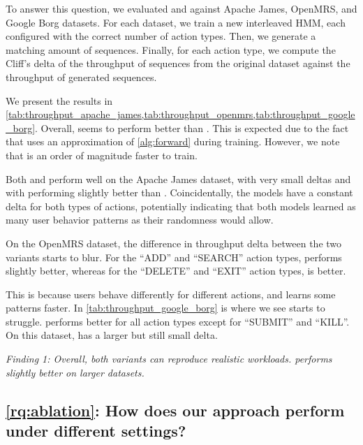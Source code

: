 To answer this question, we evaluated \worklogalpha{} and \worklogbeta{} against Apache James, OpenMRS, and Google Borg datasets. For each dataset, we train a new interleaved HMM, each configured with the correct number of action types. Then, we generate a matching amount of sequences. Finally, for each action type, we compute the Cliff's delta of the throughput of sequences from the original dataset against the throughput of generated sequences.

We present the results in \cref{tab:throughput_apache_james,tab:throughput_openmrs,tab:throughput_google_borg}. Overall, \worklogalpha{} seems to perform better than \worklogbeta{}. This is expected due to the fact that \worklogbeta{} uses an approximation of \cref{alg:forward} during training. However, we note that \worklogbeta{} is an order of magnitude faster to train. 

Both \worklogalpha{} and \worklogbeta{} perform well on the Apache James dataset, with very small deltas and with \worklogalpha{} performing slightly better than \worklogbeta{}. Coincidentally, the models have a constant delta for both types of actions, potentially indicating that both models learned as many user behavior patterns as their randomness would allow.

On the OpenMRS dataset, the difference in throughput delta between the two variants starts to blur. For the ``ADD'' and ``SEARCH'' action types, \worklogalpha{} performs slightly better, whereas for the ``DELETE'' and ``EXIT'' action types, \worklogbeta{} is better.

This is because users behave differently for different actions, and \worklogbeta{} learns some patterns faster. In \cref{tab:throughput_google_borg} is where we see \worklogbeta{} starts to struggle. \worklogalpha{} performs better for all action types except for ``SUBMIT'' and ``KILL''. On this dataset, \worklogbeta{} has a larger but still small delta.

\emph{Finding 1: Overall, both variants can reproduce realistic workloads. \worklogalpha{} performs slightly better on larger datasets.}

\subsection*{\cref{rq:ablation}: How does our approach perform under different settings?}

